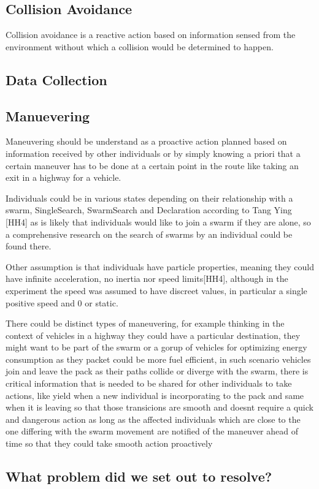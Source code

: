 \documentclass[journal]{IEEEtran}
\begin{document}
\subsection{Collision Avoidance}
Collision avoidance is a reactive action based on information sensed from the environment without which a collision would be determined to happen.
\subsection{Data Collection}
\subsection{Manuevering}
Maneuvering should be understand as a proactive action planned based on information received by other individuals or by simply knowing a priori that a certain maneuver has to be done at a certain point in the route like taking an exit in a highway for a vehicle.

Individuals could be in various states depending on their relationship with a swarm, SingleSearch, SwarmSearch and Declaration according to Tang Ying [HH4] as is likely that individuals would like to join a swarm if they are alone, so a comprehensive research on the search of swarms by an individual could be found there.

Other assumption is that individuals have particle properties, meaning they could have infinite acceleration, no inertia nor speed limits[HH4], although in the experiment the speed was assumed to have discreet values, in particular a single positive speed and 0 or static.

There could be distinct types of maneuvering, for example thinking in the context of vehicles in a highway they could have a particular destination, they might want to be part of the swarm or a gorup of vehicles for optimizing energy consumption as they packet could be more fuel efficient, in such scenario vehicles join and leave the pack as their paths collide or diverge with the swarm, there is critical information that is needed to be shared for other individuals to take actions, like yield when a new individual is incorporating to the pack and same when it is leaving so that those transicions are smooth and doesnt require a quick and dangerous action as long as the affected individuals which are close to the one differing with the swarm movement are notified of the maneuver ahead of time so that they could take smooth action proactively

\subsection{What problem did we set out to resolve?}
\end{document}
